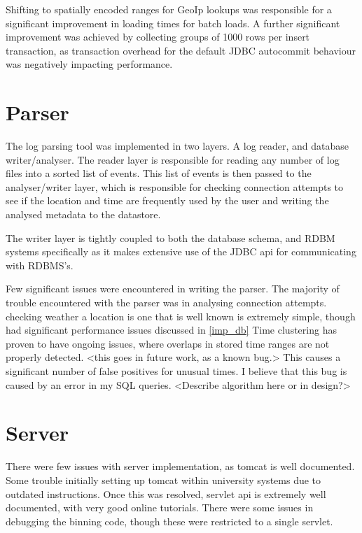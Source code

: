 Shifting to spatially encoded ranges for GeoIp lookups was responsible for a significant improvement in loading times for batch loads. A further significant improvement was achieved by collecting groups of 1000 rows per insert transaction, as transaction overhead for the default JDBC autocommit behaviour was negatively impacting performance. 
 
\section{Parser}

The log parsing tool was implemented in two layers. A log reader, and database writer/analyser. 
The reader layer is responsible for reading any number of log files into a sorted list of events.
This list of events is then passed to the analyser/writer layer, which is responsible for checking connection attempts to see if the location and time are frequently used by the user and writing the analysed metadata to the datastore.

The writer layer is tightly coupled to both the database schema, and RDBM systems specifically as it makes extensive use of the JDBC api for communicating with RDBMS's.

Few significant issues were encountered in writing the parser. 
The majority of trouble encountered with the parser was in analysing connection attempts. checking weather a location  is one that is well known is extremely simple, though had significant performance issues discussed in \ref{imp_db}
Time clustering has proven to have ongoing issues, where overlaps in stored time ranges are not properly detected. <this goes in future work, as a known bug.> This causes a significant number of false positives for unusual times. I believe that this bug is caused by an error in my SQL queries. 
<Describe algorithm here or in design?>

\section{Server}

There were few issues with server implementation, as tomcat is well documented.
Some trouble initially setting up tomcat within university systems due to outdated instructions. 
Once this was resolved, servlet api is extremely well documented, with very good online tutorials. 
There were some issues in debugging the binning code, though these were restricted to a single servlet. 


